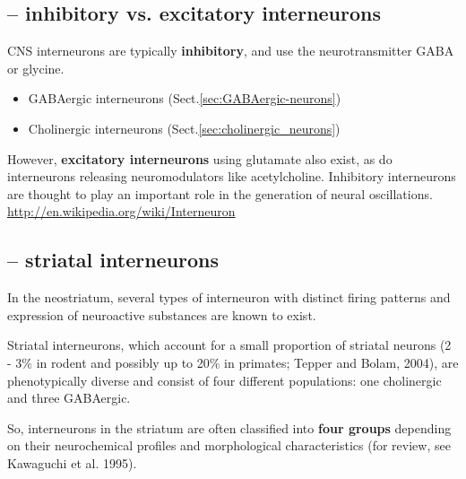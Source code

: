 \subsection{-- inhibitory vs. excitatory interneurons}
\label{sec:interneuron-Groups-inhibitory-excitatory}

CNS interneurons are typically {\bf inhibitory}, and use the neurotransmitter
GABA or glycine. 
\begin{itemize}

  \item GABAergic interneurons (Sect.\ref{sec:GABAergic-neurons})

  \item Cholinergic interneurons (Sect.\ref{sec:cholinergic_neurons})
\end{itemize}

However, {\bf excitatory interneurons} using glutamate also
exist, as do interneurons releasing neuromodulators like acetylcholine.
Inhibitory interneurons are thought to play an important role in the generation
of neural oscillations.
\url{http://en.wikipedia.org/wiki/Interneuron}


\subsection{-- striatal interneurons}
\label{sec:interneurons-striatum}	
\label{sec:striatal-interneuron}

In  the  neostriatum,  several  types  of  interneuron  with  distinct firing 
patterns  and  expression  of  neuroactive  substances  are known to exist.

Striatal interneurons, which account for a small proportion of striatal neurons
(2 - 3\% in rodent and possibly up to 20\% in primates; Tepper and Bolam, 2004),
are phenotypically diverse and consist of four different populations: one
cholinergic and three GABAergic.
 
So, interneurons in the striatum are often classified into {\bf four groups}
depending on their neurochemical profiles and morphological characteristics (for
review, see Kawaguchi et al. 1995).
 
